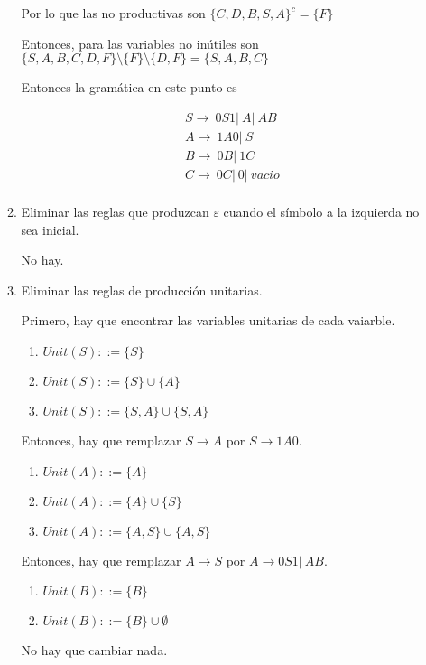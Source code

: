 \documentclass{article}
\begin{document}
\begin{enumerate}
\begin{enumerate}
        Por lo que las no productivas son $\{C, D, B, S, A\}^{c} = \{F\}$

        Entonces, para las variables no inútiles son
        $\{S, A, B, C, D, F\} \setminus \{F\} \setminus \{D, F\}
        = \{S, A, B, C\}$

        Entonces la gramática en este punto es 

        \begin{align*}
            &S \rightarrow \ 0S1 |\ A |\ AB \\
            &A \rightarrow \ 1A0 |\ S \\
            &B \rightarrow \ 0B |\ 1C \\
            &C \rightarrow \ 0C |\ 0 |\ vacio \\
        \end{align*}

        \item Eliminar las reglas que produzcan $\varepsilon$ cuando el símbolo
        a la izquierda no sea inicial.

        No hay.

        \item Eliminar las reglas de producción unitarias.
        
        Primero, hay que encontrar las variables unitarias de cada vaiarble.
        \begin{enumerate}
            \item $Unit(S) ::= \{S\}$
            \item $Unit(S) ::= \{S\} \cup \{A\}$
            \item $Unit(S) ::= \{S, A\} \cup \{S, A\}$
        \end{enumerate}

        Entonces, hay que remplazar $S \rightarrow A$ por $S \rightarrow 1A0$.

        \begin{enumerate}
            \item $Unit(A) ::= \{A\}$
            \item $Unit(A) ::= \{A\} \cup \{S\}$
            \item $Unit(A) ::= \{A, S\} \cup \{A, S\}$
        \end{enumerate}

        Entonces, hay que remplazar $A \rightarrow S$ por $A \rightarrow 0S1| \ AB$.

        \begin{enumerate}
            \item $Unit(B) ::= \{B\}$
            \item $Unit(B) ::= \{B\} \cup \emptyset$
        \end{enumerate}
        No hay que cambiar nada.


\end{enumerate}
\end{enumerate}
\end{document}
